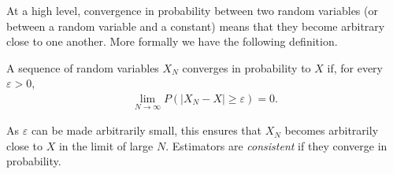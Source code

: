 At a high level, convergence in probability between two random variables (or between a random variable and
a constant) means that they become arbitrary close to one another.  More
formally we have the following definition.
\begin{definition}
A sequence of random variables $X_N$ converges in probability to $X$ if, for every $\varepsilon>0$,
\begin{align}
\lim\limits_{N\rightarrow\infty} P(\left|X_N-X\right|\ge\varepsilon)=0.
\end{align}
\end{definition}
\noindent As $\varepsilon$ can be made arbitrarily small, this ensures that $X_N$ becomes arbitrarily
close to $X$ in the limit of large $N$.  Estimators are \emph{consistent} if they converge
in probability.

